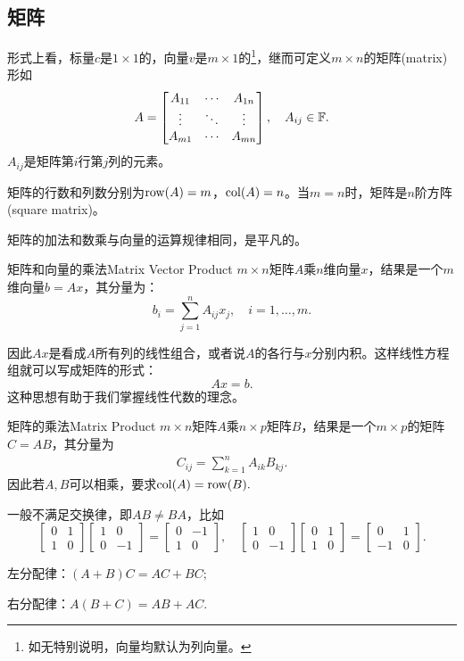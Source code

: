 \subsection{矩阵}
形式上看，标量$c$是$1\times 1$的，向量$v$是$m\times 1$的\footnote{如无特别说明，向量均默认为列向量。}，继而可定义$m\times n$的矩阵(matrix)形如
\[
	A=\begin{bmatrix}
		A_{11}&\cdots&A_{1n}\\
		\vdots&\ddots&\vdots\\
		A_{m1}&\cdots&A_{mn}
	\end{bmatrix},\quad A_{ij}\in\mathbb F.
\]
$A_{ij}$是矩阵第$i$行第$j$列的元素。

矩阵的行数和列数分别为$\operatorname{row}(A)=m$，$\operatorname{col}(A)=n$。当$m=n$时，矩阵是$n$阶方阵(square matrix)。

矩阵的加法和数乘与向量的运算规律相同，是平凡的。
\begin{definition}{矩阵和向量的乘法}{Matrix Vector Product}
	$m\times n$矩阵$A$乘$n$维向量$x$，结果是一个$m$维向量$b=Ax$，其分量为：
	\begin{equation}
		b_i=\sum_{j=1}^nA_{ij}x_j,\quad i=1,\ldots,m.
	\end{equation}
\end{definition}
因此$Ax$是看成$A$所有列的线性组合，或者说$A$的各行与$x$分别内积。这样线性方程组就可以写成矩阵的形式：
\[
	Ax=b.
\]
这种思想有助于我们掌握线性代数的理念。
\begin{definition}{矩阵的乘法}{Matrix Product}
	$m\times n$矩阵$A$乘$n\times p$矩阵$B$，结果是一个$m\times p$的矩阵$C=AB$，其分量为
	\begin{align}
		C_{ij}=\sum_{k=1}^nA_{ik}B_{kj}.
	\end{align}
	因此若$A,B$可以相乘，要求$\operatorname{col}(A)=\operatorname{row}(B).$
\end{definition}
\begin{compactitem}
	\item 一般不满足交换律，即$AB\neq BA$，比如
	\[
		\begin{bmatrix}
			0&1\\1&0
		\end{bmatrix}\begin{bmatrix}
			1&0\\0&-1
		\end{bmatrix}=\begin{bmatrix}
			0&-1\\1&0
		\end{bmatrix},\quad\begin{bmatrix}
			1&0\\0&-1
		\end{bmatrix}\begin{bmatrix}
			0&1\\1&0
		\end{bmatrix}=\begin{bmatrix}
			0&1\\-1&0
		\end{bmatrix}.
	\]
	\item 左分配律：$(A+B)C=AC+BC;$
	\item 右分配律：$A(B+C)=AB+AC.$
\end{compactitem}
